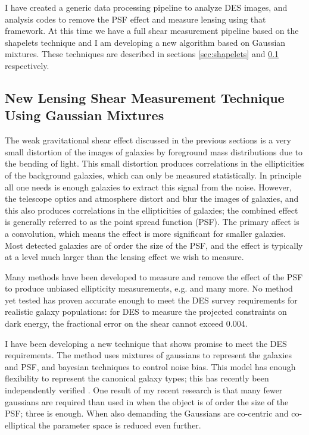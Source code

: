 \documentclass[12pt]{article}
\begin{document}
I have created a generic data processing pipeline to analyze DES images, and
analysis codes to remove the PSF effect and measure lensing using that
framework.  At this time we have a full shear measurement pipeline based on the
shapelets technique and I am developing a new algorithm based on Gaussian
mixtures.  These techniques are described in sections \ref{sec:shapelets} and
\ref{sec:gmix} respectively.

\subsection{New Lensing Shear Measurement Technique Using Gaussian Mixtures}
\label{sec:gmix}

The weak gravitational shear effect discussed in the previous sections is a
very small distortion of the images of galaxies by foreground mass
distributions due to the bending of light.  This small distortion produces
correlations in the ellipticities of the background galaxies, which can only be
measured statistically.  In principle all one needs is enough galaxies to
extract this signal from the noise.  However, the telescope optics and
atmosphere distort and blur the images of galaxies, and this also produces
correlations in the ellipticities of galaxies; the combined effect is generally
referred to as the point spread function (PSF). The primary affect is a
convolution, which means the effect is more significant for smaller galaxies.
Most detected galaxies are of order the size of the PSF, and the effect is
typically at a level much larger than the lensing effect we wish to measure.

Many methods have been developed to measure and remove the effect of the PSF to
produce unbiased ellipticity measurements, e.g.
\cite{ksb95,Bern02,Miller07,Melchior11} and many more.  No method yet tested
has proven accurate enough to meet the DES survey requirements for realistic
galaxy populations:  for DES to measure the projected constraints on
dark energy, the fractional error on the shear cannot exceed 0.004.

I have been developing a new technique that shows promise to meet the DES
requirements.  The method uses mixtures of gaussians to represent the galaxies
and PSF, and bayesian techniques to control noise bias.  This model has enough
flexibility to represent the canonical galaxy types; this has recently been
independently verified \citep{HoggGMix12}.  One result of my recent
research is that many fewer gaussians are required than used in
\cite{HoggGMix12} when the object is of order the size of the PSF; three is
enough.  When also demanding the Gaussians are co-centric and co-elliptical the
parameter space is reduced even further.  
\end{document}
